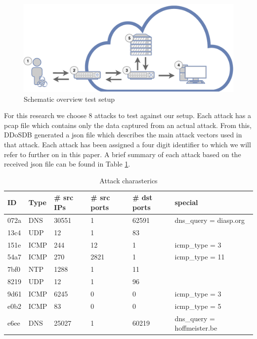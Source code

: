 \begin{figure}[H]
\centering
\includegraphics[width=\textwidth]{./images/test-setup.pdf}
\caption{Schematic overview test setup}
\end{figure}\label{fig:test-setup}

For this research we choose 8 attacks to test against our setup. Each attack has a pcap file which contains only the data captured from an actual attack. From this, DDoSDB generated a json file which describes the main attack vectors used in that attack. Each attack has been assigned a four digit identifier to which we will refer to further on in this paper. A brief summary of each attack based on the received json file can be found in Table \ref{tab:json-summarry}.  


\begin{table}[H]
\centering
\begin{tabular}{l | l | l | l | l | l}
ID & Type & \# src IPs & \# src ports & \# dst ports & special  \\ \hline \hline
072a & DNS & 30551 & 1 & 62591 & dns\_query = diasp.org \\ \hline
13c4 & UDP & 12 & 1 & 83 &  \\ \hline
151e & ICMP & 244 & 12 & 1 & icmp\_type = 3 \\ \hline
54a7 & ICMP & 270 & 2821 & 1 & icmp\_type = 11 \\ \hline
7bf0 & NTP & 1288 & 1 & 11 &  \\ \hline
8219 & UDP & 12 & 1 & 96 &  \\ \hline
9d61 & ICMP & 6245 & 0 & 0 & icmp\_type = 3 \\ \hline
e0b2 & ICMP & 83 & 0 & 0 & icmp\_type = 5 \\ \hline
e6ee & DNS & 25027 & 1 & 60219 & dns\_query = hoffmeister.be
\end{tabular}
\caption{\label{tab:json-summarry}Attack charasterics}
\end{table}

